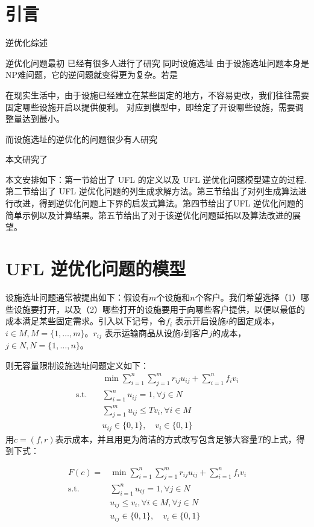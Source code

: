\documentclass[UTF8]{article}
\begin{document}
\section{引言}  %
逆优化综述

逆优化问题最初
已经有很多人进行了研究
同时设施选址
由于设施选址问题本身是NP难问题，它的逆问题就变得更为复杂。若是

在现实生活中，由于设施已经建立在某些固定的地方，不容易更改，我们往往需要固定哪些设施开启以提供便利。
对应到模型中，即给定了开设哪些设施，需要调整量达到最小。

而设施选址的逆优化的问题很少有人研究

本文研究了

本文安排如下：第一节给出了 UFL 的定义以及 UFL 逆优化问题模型建立的过程.第二节给出了 UFL 逆优化问题的列生成求解方法。第三节给出了对列生成算法进行改进，得到逆优化问题上下界的启发式算法。第四节给出了UFL 逆优化问题的简单示例以及计算结果。第五节给出了对于该逆优化问题延拓以及算法改进的展望。


\section{ UFL 逆优化问题的模型}

设施选址问题通常被提出如下：假设有$m$个设施和$n$个客户。我们希望选择（1）哪些设施要打开，以及（2）哪些打开的设施要用于向哪些客户提供，以便以最低的成本满足某些固定需求。引入以下记号，令$f_i$ 表示开启设施$i$的固定成本，$i \in M, M=\{1,\ldots,m\}$。$r_{ij}$ 表示运输商品从设施$i$到客户$j$的成本，$j \in N, N=\{1,\ldots,n\}$。

则无容量限制设施选址问题定义如下：
\begin{align*}
&\min \sum_{i=1}^n \sum_{j=1}^m r_{ij}u_{ij} + \sum_{i=1}^n f_i v_i \\
\text{s.t.}\quad & \sum_{i=1}^n u_{ij} =1, \forall j \in N  \\
&\sum_{j=1}^m u_{ij}  \leq Tv_i, \forall i \in M \\
& u_{ij} \in \{0,1\}, \quad v_{i} \in \{0,1\}
\end{align*}
用$c=(f,r)$表示成本，并且用更为简洁的方式改写包含足够大容量$T$的上式，得到下式：

\begin{align*}
F(c) = &\min \sum_{i=1}^n \sum_{j=1}^m r_{ij}u_{ij} + \sum_{i=1}^n f_i v_i \\
\text{s.t.}\quad & \sum_{i=1}^n u_{ij} =1, \forall j \in N  \\
& u_{ij}  \leq v_i, \forall i \in M ,\forall j \in N\\
& u_{ij} \in \{0,1\}, \quad v_{i} \in \{0,1\}
\end{align*}
\end{document}
